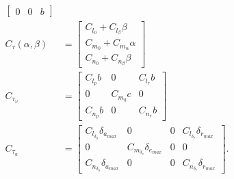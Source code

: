 \documentclass[letterpaper, 10 pt, conference]{ieeeconf}  %
\begin{document}
\begin{appendices}
\begin{align}
\begin{bmatrix}
0 & 0 & b
\end{bmatrix}\\
C_{\tau}\left(\alpha,\beta\right) & =\begin{bmatrix}C_{l_{0}}+C_{l_{\beta}}\beta\\
C_{m_{0}}+C_{m_{\alpha}}\alpha\\
C_{n_{0}}+C_{n_{\beta}}\beta
\end{bmatrix}\\
C_{\tau_{\omega}} & =\begin{bmatrix}C_{l_{p}}b & 0 & C_{l_{r}}b\\
0 & C_{m_{q}}c & 0\\
C_{n_{p}}b & 0 & C_{n_{r}}b
\end{bmatrix}\\
C_{\tau_{u}} & =\begin{bmatrix}C_{l_{\delta_{a}}}\delta_{a_{max}} & 0 & 0 & C_{l_{\delta_{r}}}\delta_{r_{max}}\\
0 & C_{m_{\delta_{e}}}\delta_{e_{max}} & 0 & 0\\
C_{n_{\delta_{a}}}\delta_{a_{max}} & 0 & 0 & C_{n_{\delta_{r}}}\delta_{r_{max}}
\end{bmatrix}.
\end{align}

\end{appendices}




\end{document}
